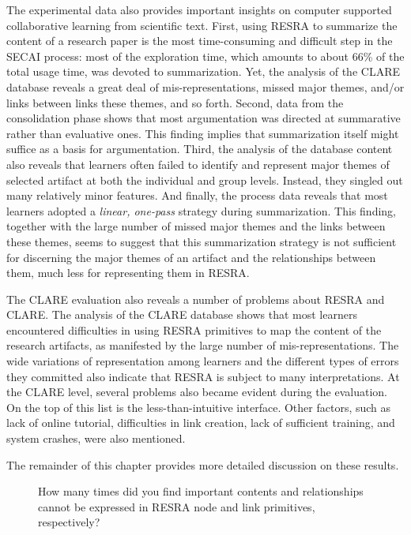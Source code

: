 The experimental data also provides important insights on computer
supported collaborative learning from scientific text. First, using RESRA
to summarize the content of a research paper is the most time-consuming and
difficult step in the SECAI process: most of the exploration time, which
amounts to about 66\% of the total usage time, was devoted to
summarization. Yet, the analysis of the CLARE database reveals a great deal
of mis-representations, missed major themes, and/or links between links
these themes, and so forth. Second, data from the consolidation phase shows
that most argumentation was directed at summarative rather than evaluative
ones. This finding implies that summarization itself might suffice as a
basis for argumentation. Third, the analysis of the database content also
reveals that learners often failed to identify and represent major themes
of selected artifact at both the individual and group levels. Instead, they
singled out many relatively minor features. And finally, the process data
reveals that most learners adopted a {\it linear, one-pass\/} strategy
during summarization.  This finding, together with the large number of
missed major themes and the links between these themes, seems to suggest
that this summarization strategy is not sufficient for discerning the major
themes of an artifact and the relationships between them, much less for
representing them in RESRA.

The CLARE evaluation also reveals a number of problems about RESRA and
CLARE. The analysis of the CLARE database shows that most learners
encountered difficulties in using RESRA primitives to map the content of
the research artifacts, as manifested by the large number of
mis-representations. The wide variations of representation among learners
and the different types of errors they committed also indicate that RESRA
is subject to many interpretations. At the CLARE level, several problems
also became evident during the evaluation. On the top of this list is the
less-than-intuitive interface. Other factors, such as lack of online
tutorial, difficulties in link creation, lack of sufficient training, and
system crashes, were also mentioned.

The remainder of this chapter provides more detailed discussion on these
results.

\begin{figure}[htbp]
 \caption{How many times did you find important contents and
 relationships cannot be expressed in RESRA node and link primitives,
 respectively?}
  \label{fig:c6-resra}
\end{figure}


